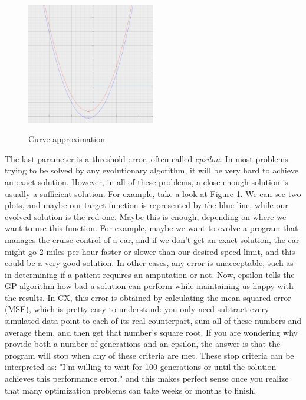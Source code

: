 \documentclass[11pt,fleqn,openany]{book} %
\begin{document}
\begin{figure}
\caption{Curve approximation}
\centering
\includegraphics[width=0.5\textwidth]{img/curve-approximation.png}
\label{figure:curve-approximation}
\end{figure}

The last parameter is a threshold error, often called \emph{epsilon}. In most problems trying to be solved by any evolutionary algorithm, it will be very hard to achieve an exact solution. However, in all of these problems, a close-enough solution is usually a sufficient solution. For example, take a look at Figure \ref{figure:curve-approximation}. We can see two plots, and maybe our target function is represented by the blue line, while our evolved solution is the red one. Maybe this is enough, depending on where we want to use this function. For example, maybe we want to evolve a program that manages the cruise control of a car, and if we don't get an exact solution, the car might go 2 miles per hour faster or slower than our desired speed limit, and this could be a very good solution. In other cases, any error is unacceptable, such as in determining if a patient requires an amputation or not. Now, epsilon tells the GP algorithm how bad a solution can perform while maintaining us happy with the results. In CX, this error is obtained by calculating the mean-squared error (MSE), which is pretty easy to understand: you only need subtract every simulated data point to each of its real counterpart, sum all of these numbers and average them, and then get that number's square root. If you are wondering why provide both a number of generations and an epsilon, the answer is that the program will stop when any of these criteria are met. These stop criteria can be interpreted as: "I'm willing to wait for 100 generations or until the solution achieves this performance error," and this makes perfect sense once you realize that many optimization problems can take weeks or months to finish.
\end{document}
